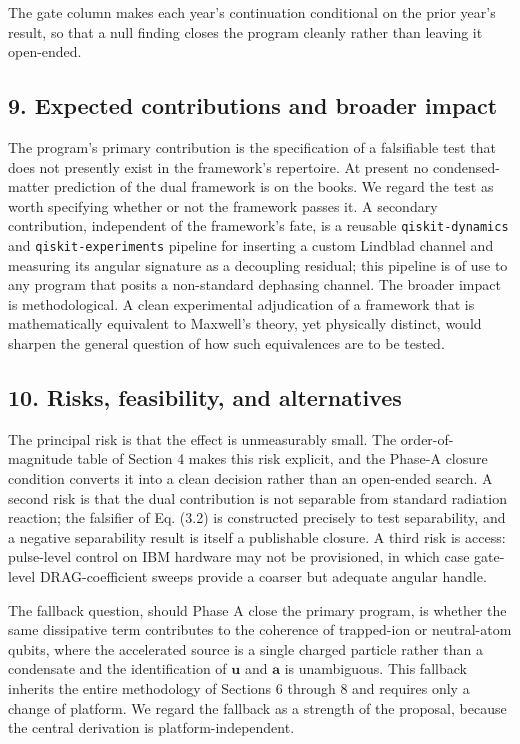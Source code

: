 \documentclass[
  11pt,
]{article}
\begin{document}
The gate column makes each year's continuation conditional on the prior
year's result, so that a null finding closes the program cleanly rather
than leaving it open-ended.

\hypertarget{expected-contributions-and-broader-impact}{%
\subsection{9. Expected contributions and broader
impact}\label{expected-contributions-and-broader-impact}}

The program's primary contribution is the specification of a falsifiable
test that does not presently exist in the framework's repertoire. At
present no condensed-matter prediction of the dual framework is on the
books. We regard the test as worth specifying whether or not the
framework passes it. A secondary contribution, independent of the
framework's fate, is a reusable \texttt{qiskit-dynamics} and
\texttt{qiskit-experiments} pipeline for inserting a custom Lindblad
channel and measuring its angular signature as a decoupling residual;
this pipeline is of use to any program that posits a non-standard
dephasing channel. The broader impact is methodological. A clean
experimental adjudication of a framework that is mathematically
equivalent to Maxwell's theory, yet physically distinct, would sharpen
the general question of how such equivalences are to be tested.

\hypertarget{risks-feasibility-and-alternatives}{%
\subsection{10. Risks, feasibility, and
alternatives}\label{risks-feasibility-and-alternatives}}

The principal risk is that the effect is unmeasurably small. The
order-of-magnitude table of Section 4 makes this risk explicit, and the
Phase-A closure condition converts it into a clean decision rather than
an open-ended search. A second risk is that the dual contribution is not
separable from standard radiation reaction; the falsifier of Eq. (3.2)
is constructed precisely to test separability, and a negative
separability result is itself a publishable closure. A third risk is
access: pulse-level control on IBM hardware may not be provisioned, in
which case gate-level DRAG-coefficient sweeps provide a coarser but
adequate angular handle.

The fallback question, should Phase A close the primary program, is
whether the same dissipative term contributes to the coherence of
trapped-ion or neutral-atom qubits, where the accelerated source is a
single charged particle rather than a condensate and the identification
of \(\mathbf{u}\) and \(\mathbf{a}\) is unambiguous. This fallback
inherits the entire methodology of Sections 6 through 8 and requires
only a change of platform. We regard the fallback as a strength of the
proposal, because the central derivation is platform-independent.
\end{document}
